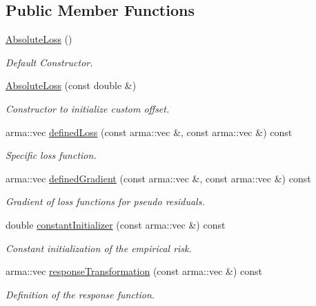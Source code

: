 \subsection*{Public Member Functions}
\begin{DoxyCompactItemize}
\item 
\mbox{\hyperlink{classloss_1_1_absolute_loss_a4b1416147d0573079f9d652097c1ab81}{Absolute\+Loss}} ()
\begin{DoxyCompactList}\small\item\em Default Constructor. \end{DoxyCompactList}\item 
\mbox{\hyperlink{classloss_1_1_absolute_loss_a3e056fbde0b63527bb9aadb0a4a8547a}{Absolute\+Loss}} (const double \&)
\begin{DoxyCompactList}\small\item\em Constructor to initialize custom offset. \end{DoxyCompactList}\item 
arma\+::vec \mbox{\hyperlink{classloss_1_1_absolute_loss_acfef6f0de3cfcccebd4bbfc04133cf1e}{defined\+Loss}} (const arma\+::vec \&, const arma\+::vec \&) const
\begin{DoxyCompactList}\small\item\em Specific loss function. \end{DoxyCompactList}\item 
arma\+::vec \mbox{\hyperlink{classloss_1_1_absolute_loss_a1886fc8ca065c6f0a207b7a8a0f8444d}{defined\+Gradient}} (const arma\+::vec \&, const arma\+::vec \&) const
\begin{DoxyCompactList}\small\item\em Gradient of loss functions for pseudo residuals. \end{DoxyCompactList}\item 
double \mbox{\hyperlink{classloss_1_1_absolute_loss_aa2ac5fb1fdf3ce0f48decd77d375ef76}{constant\+Initializer}} (const arma\+::vec \&) const
\begin{DoxyCompactList}\small\item\em Constant initialization of the empirical risk. \end{DoxyCompactList}\item 
arma\+::vec \mbox{\hyperlink{classloss_1_1_absolute_loss_aa7e0ac902d905ae97f9e2d0337c6c058}{response\+Transformation}} (const arma\+::vec \&) const
\begin{DoxyCompactList}\small\item\em Definition of the response function. \end{DoxyCompactList}\end{DoxyCompactItemize}
